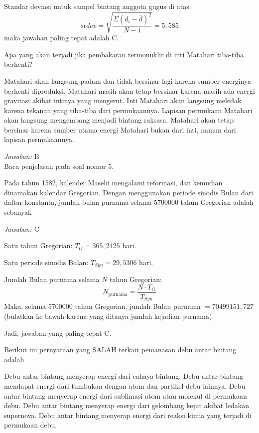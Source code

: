 \documentclass[11pt,fleqn]{exam}
\begin{document}
\begin{questions}
Standar deviasi untuk sampel bintang anggota gugus di atas:
$$stdev=\sqrt{\frac{\Sigma(d_i-\overline{d})^2}{N-1}}=5,585$$ 
maka jawaban paling tepat adalah C.

\question Apa yang akan terjadi jika pembakaran termonuklir di inti Matahari tiba-tiba berhenti?
\begin{choices}
\choice Matahari akan langsung padam dan tidak bersinar lagi karena sumber energinya berhenti diproduksi.
\choice Matahari masih akan tetap bersinar karena masih ada energi gravitasi akibat intinya yang mengerut.
\choice Inti Matahari akan langsung meledak karena tekanan yang tiba-tiba dari permukaannya.
\choice Lapisan permukaan Matahari akan langsung mengembang menjadi bintang raksasa.
\choice Matahari akan tetap bersinar karena sumber utama energi Matahari bukan dari inti, namun dari lapisan permukaannya.
\end{choices}

\textit{Jawaban: }B\\
Baca penjelasan pada soal nomor 5.

\question Pada tahun 1582, kalender Masehi mengalami reformasi, dan kemudian dinamakan kalendar Gregorian. Dengan menggunakan periode sinodis Bulan dari daftar konstanta, jumlah bulan purnama selama 5700000 tahun Gregorian adalah sebanyak
\begin{choices}
\end{choices}

\textit{Jawaban: }C

Satu tahun Gregorian: $T_G=365,2425$ hari. 

Satu periode sinodis Bulan: $T_{Syn}=29,5306$ hari.

Jumlah Bulan purnama selama $N$ tahun Gregorian: 
$$N_{\text{purnama}}= \frac{N \cdot T_G}{T_{Syn}}$$ 
Maka, selama 5700000 tahun Gregorian, jumlah Bulan purnama $=70499151,727$ (bulatkan ke bawah karena yang ditanya jumlah kejadian purnama).

Jadi, jawaban yang paling tepat C.

\question Berikut ini pernyataan yang SALAH terkait pemanasan debu antar bintang adalah
\begin{choices}
\choice Debu antar bintang menyerap energi dari cahaya bintang.
\choice Debu antar bintang mendapat energi dari tumbukan dengan atom dan partikel debu lainnya.
\choice Debu antar bintang menyerap energi dari sublimasi atom atau molekul di permukaan debu.
\choice Debu antar bintang menyerap energi dari gelombang kejut akibat ledakan supernova.
\choice Debu antar bintang menyerap energi dari reaksi kimia yang terjadi di permukaan debu.
\end{choices}


\end{questions}
\end{document}
